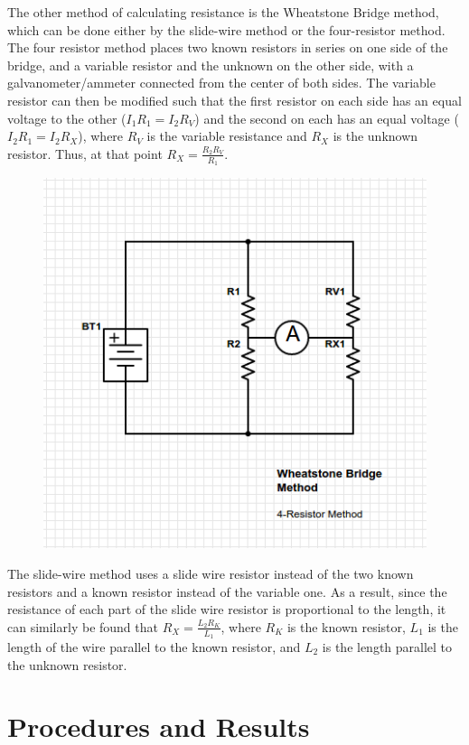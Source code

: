 \documentclass[11pt, titlepage]{article}
\begin{document}
The other method of calculating resistance is the Wheatstone Bridge method, which can be done either by the slide-wire method or the four-resistor method. The four resistor method places two known resistors in series on one side of the bridge, and a variable resistor and the unknown on the other side, with a galvanometer/ammeter connected from the center of both sides. The variable resistor can then be modified such that the first resistor on each side has an equal voltage to the other ($I_1R_1 = I_2R_V$) and the second on each has an equal voltage ($I_2R_1 = I_2R_X$), where $R_V$ is the variable resistance and $R_X$ is the unknown resistor. Thus, at that point $R_X = \frac{R_2R_V}{R_1}$.

\begin{figure}[h]
\centering
\hspace*{0cm}
\includegraphics[scale=1, angle=0]{circuit3.jpg}
\vspace*{0cm}
\end{figure}

The slide-wire method uses a slide wire resistor instead of the two known resistors and a known resistor instead of the variable one. As a result, since the resistance of each part of the slide wire resistor is proportional to the length, it can similarly be found that $R_X = \frac{L_2R_K}{L_1}$, where $R_K$ is the known resistor, $L_1$ is the length of the wire parallel to the known resistor, and $L_2$ is the length parallel to the unknown resistor.

\section*{Procedures and Results}
\end{document}

